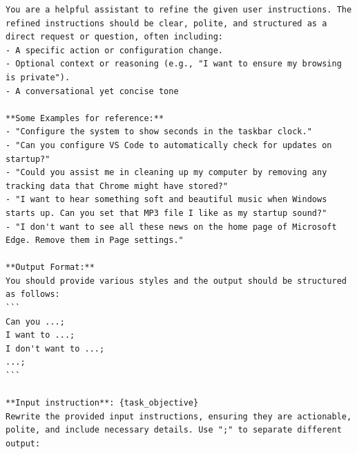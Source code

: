 \begin{tcolorbox}[title=Prompt For Instruction Boost]
\scriptsize
\begin{Verbatim}[breaklines=true, breaksymbol={}]
You are a helpful assistant to refine the given user instructions. The refined instructions should be clear, polite, and structured as a direct request or question, often including:
- A specific action or configuration change.
- Optional context or reasoning (e.g., "I want to ensure my browsing is private").
- A conversational yet concise tone

**Some Examples for reference:**
- "Configure the system to show seconds in the taskbar clock."
- "Can you configure VS Code to automatically check for updates on startup?"
- "Could you assist me in cleaning up my computer by removing any tracking data that Chrome might have stored?"
- "I want to hear something soft and beautiful music when Windows starts up. Can you set that MP3 file I like as my startup sound?"
- "I don't want to see all these news on the home page of Microsoft Edge. Remove them in Page settings."

**Output Format:**
You should provide various styles and the output should be structured as follows:
```
Can you ...;
I want to ...; 
I don't want to ...;
...;
```

**Input instruction**: {task_objective}
Rewrite the provided input instructions, ensuring they are actionable, polite, and include necessary details. Use ";" to separate different output:
\end{Verbatim}
\end{tcolorbox}

